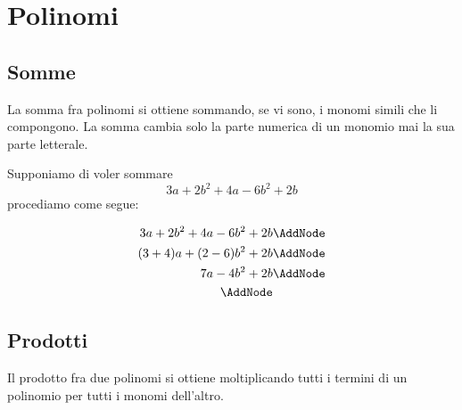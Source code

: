 \chapter{Polinomi}
\label{cha:polinomi}
\minitoc
\mtcskip                                %
\minilof                                %
\mtcskip                                %
\minilot
\section{Somme}
\label{sec:somme}
La somma fra polinomi si ottiene sommando, se vi sono, i monomi simili che li compongono. La somma cambia solo la parte numerica di un monomio mai la sua parte letterale. 
\begin{esempio}
Supponiamo di voler sommare\[ 3a+2b^2+4a-6b^2+2b\] procediamo come segue:
	 \begin{NodesList} %
	 	\begin{align*}
	 		3a+2b^2+4a-6b^2+2b&                           \AddNode\\
	 		(3+4)a+(2-6)b^2+2b&          \AddNode\\                                       		
	 		7a-4b^2+2b&   \AddNode\\
	 		\AddNode
	 	\end{align*}
	  \end{NodesList}
\end{esempio}
\section{Prodotti}
Il prodotto fra due polinomi si ottiene moltiplicando tutti i termini di un polinomio per tutti i monomi dell'altro. 
